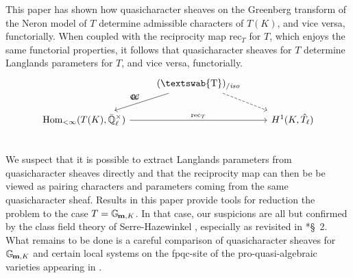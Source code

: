 \documentclass[11pt]{amsart}
\DeclareRobustCommand{\VAN}[3]{#2}
\newcommand{\mathswab}[1]{\operatorname{\textswab{#1}}}
\theoremstyle{plain}
\theoremstyle{definition}
\theoremstyle{remark}
\newcommand{\EE}{\mathbb{\bar Q}_\ell}
\newcommand{\EEx}{\EE^\times}
\DeclareMathOperator{\Hom}{Hom}
\newcommand{\Gm}[1]{\mathbb{G}_{\hskip-1pt\textbf{m},#1}}
\newcommand{\GN}[1]{\mathswab{#1}}
\newcommand{\QC}{{\mathcal{Q\hskip-0.8pt C}}}
\newcommand{\QCiso}[1]{\QC(#1)_{/\textit{iso}}}
\newcommand{\trFrob}[1]{t_{#1}}
\begin{document}
This paper has shown how quasicharacter sheaves 
on the Greenberg transform of the N\/eron model of $T$ 
determine admissible characters of $T(K)$, and vice versa, functorially.
When coupled with the reciprocity map $\text{rec}_T $ for $T$, 
which enjoys the same functorial properties, 
it follows that quasicharacter sheaves for $T$ 
determine Langlands parameters for $T$, and vice versa, functorially.
\[
\begin{tikzcd}
\ & \arrow[swap]{dl}{\trFrob{G}} \QCiso{\GN{T}} \arrow[dashed]{dr}  & \\
\Hom_{<\infty}(T(K),\EEx) \arrow{rr}{\text{rec}_T} && H^1(K,\hat{T}_\ell) \\
\end{tikzcd}
\]
We suspect that it is possible to extract Langlands parameters 
from quasicharacter sheaves directly and that the reciprocity map 
can then be be viewed as pairing characters and parameters coming
 from the same quasicharacter sheaf. 
 Results in this paper provide tools for reduction the problem to the case $T=\Gm{K}$. 
 In that case, our suspicions are all but confirmed 
 by the class field theory of Serre-Hazewinkel
 ,
 especially as revisited in \cite{suzuki-yoshida:12a}*{\S~2}. 
 What remains to be done is a careful comparison of 
 quasicharacter sheaves for $\Gm{K}$ and certain local systems on
  the fpqc-site of the pro-quasi-algebraic varieties appearing in \cite{suzuki-yoshida:12a}. 


\DeclareRobustCommand{\VAN}[3]{#3}

\end{document}
